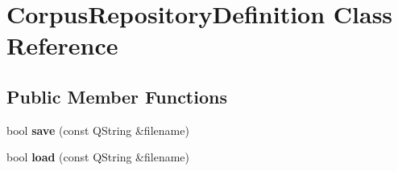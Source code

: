 \hypertarget{class_corpus_repository_definition}{}\section{Corpus\+Repository\+Definition Class Reference}
\label{class_corpus_repository_definition}
\subsection*{Public Member Functions}
\begin{DoxyCompactItemize}
\item 
\mbox{\label{class_corpus_repository_definition_a7a5fdb5ca8899be3ea4a89ddabea3dda}} 
bool {\bfseries save} (const Q\+String \&filename)
\item 
\mbox{\label{class_corpus_repository_definition_a298d1c7779aaca06b4298331d78214e1}} 
bool {\bfseries load} (const Q\+String \&filename)
\end{DoxyCompactItemize}
